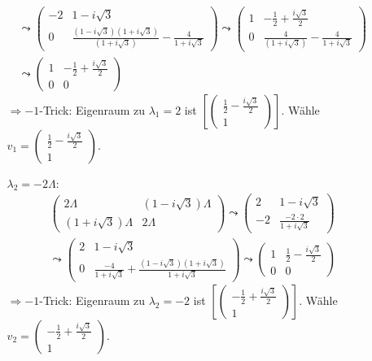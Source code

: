 \documentclass{scrartcl}
\newcommand{\vecz}[2]{\begin{pmatrix}#1 \\ #2\end{pmatrix}}
\begin{document}
\begin{enumerate}[a)]
\begin{itemize}
\begin{align*}
\leadsto\begin{pmatrix}
-2 & 1-i\sqrt 3 \\
0 & \frac{(1-i\sqrt 3)(1+i\sqrt 3)}{(1+i\sqrt 3)}-\frac{4}{1+i\sqrt 3}
\end{pmatrix}
\leadsto\begin{pmatrix}
1 & -\frac 12 + \frac{i\sqrt 3}2 \\
0 & \frac{4}{(1+i\sqrt 3)}-\frac{4}{1+i\sqrt 3}
\end{pmatrix}\\
\leadsto\begin{pmatrix}
1 & -\frac 12 + \frac{i\sqrt 3}2 \\
0 & 0
\end{pmatrix}
\end{align*}
$\Rightarrow -1$-Trick: Eigenraum zu $\lambda_1=2$ ist $\left[\vecz{\frac 12 -\frac{i\sqrt 3}2}1 \right]$. Wähle $v_1=\vecz{\frac 12 -\frac{i\sqrt 3}2}1$.

\item[$\lambda_2=-2\Lambda$:]
\begin{align*}
\begin{pmatrix}
2\Lambda & (1-i\sqrt 3)\Lambda \\ (1+i\sqrt 3)\Lambda & 2\Lambda
\end{pmatrix} \leadsto
\begin{pmatrix}
2 & 1-i\sqrt 3 \\ -2 & \frac{-2 \cdot 2}{1+i\sqrt 3}
\end{pmatrix} \\
\leadsto
\begin{pmatrix}
2 & 1-i\sqrt 3 \\ 0 & \frac{-4}{1+i\sqrt 3} +\frac{(1-i\sqrt 3) (1+i\sqrt 3)}{1+i\sqrt 3}
\end{pmatrix}
\leadsto
\begin{pmatrix}
1 & \frac 12 - \frac{i\sqrt 3}2 \\ 0 & 0
\end{pmatrix}
\end{align*}
$\Rightarrow -1$-Trick: Eigenraum zu $\lambda_2=-2$ ist $\left[\vecz{-\frac 12 +\frac{i\sqrt 3}2}1 \right]$. Wähle $v_2=\vecz{-\frac 12 +\frac{i\sqrt 3}2}1$.
\end{itemize}


\end{enumerate}
\end{document}
